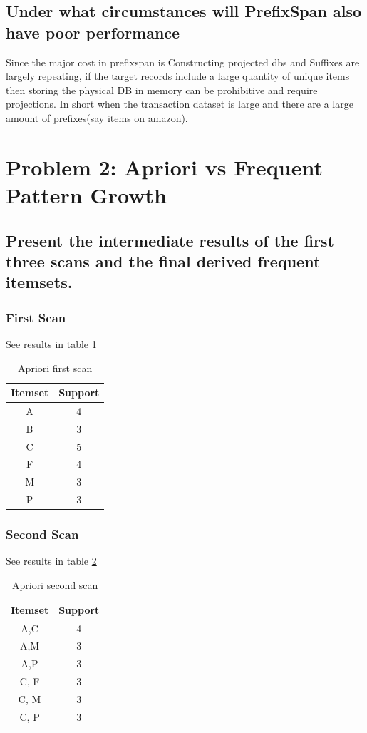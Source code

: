 \documentclass[11pt]{article}
\begin{document}
\subsection{Under what circumstances will PrefixSpan also have poor performance}
Since the major cost in prefixspan is Constructing projected dbs and Suffixes are largely repeating, if the target records include a large quantity of unique items then storing the physical DB in memory can be prohibitive and require projections. In short when the transaction dataset is large and there are a large amount of prefixes(say items on amazon).  
\section{Problem 2: Apriori vs Frequent Pattern Growth}
\subsection{Present the intermediate results of the first three scans and the final derived frequent itemsets.}
\subsubsection{First Scan}
See results in table \ref{tab:1st}
\begin{table}[]
    \centering
    \begin{tabular}{|c|c|} \hline
        Itemset & Support \\ \hline
        A & 4 \\ \hline
        B & 3 \\ \hline
        C & 5 \\ \hline
        F & 4 \\ \hline
        M & 3 \\ \hline
        P & 3 \\ \hline
    \end{tabular}
    \caption{Apriori first scan}
    \label{tab:1st}
\end{table}
\subsubsection{Second Scan}
See results in table \ref{tab:2nd}
\begin{table}[]
    \centering
    \begin{tabular}{|c|c|} \hline
        Itemset & Support \\ \hline
        A,C & 4 \\ \hline
        A,M & 3 \\ \hline
        A,P & 3 \\ \hline
        C, F & 3 \\ \hline
        C, M & 3 \\ \hline
        C, P & 3 \\ \hline
    \end{tabular}
    \caption{Apriori second scan}
    \label{tab:2nd}
\end{table}
\end{document}
